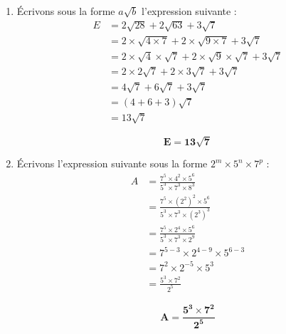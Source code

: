 \documentclass[12pt,a4paper]{article}
\begin{document}
\begin{enumerate}
\item Écrivons sous la forme \( a\sqrt{b} \) l’expression suivante :
\[
\begin{aligned}
    E &= 2\sqrt{28} + 2\sqrt{63} + 3\sqrt{7} \\[6pt]
    &= 2 \times \sqrt{4 \times 7} + 2 \times \sqrt{9 \times 7} + 3\sqrt{7} \\[6pt]
    &= 2 \times \sqrt{4} \times \sqrt{7} + 2 \times \sqrt{9} \times \sqrt{7} + 3\sqrt{7} \\[6pt]
    &= 2 \times 2\sqrt{7} + 2 \times 3\sqrt{7} + 3\sqrt{7} \\[6pt]
    &= 4\sqrt{7} + 6\sqrt{7} + 3\sqrt{7} \\[6pt]
    &= (4 + 6 + 3) \sqrt{7} \\[6pt]
    &= 13\sqrt{7}
\end{aligned}
\]

\begin{tcolorbox}[colback=yellow!20, colframe=black, sharp corners]
    \[
    \mathbf{E = 13\sqrt{7}}
    \]
\end{tcolorbox}
\item Écrivons l’expression suivante sous la forme \( 2^m \times 5^n \times 7^p \) :
\[
\begin{aligned}
    A &= \frac{7^5 \times 4^2 \times 5^6}{5^3 \times 7^3 \times 8^3} \\[6pt]
    &= \frac{7^5 \times (2^2)^2 \times 5^6}{5^3 \times 7^3 \times (2^3)^3} \\[6pt]
    &= \frac{7^5 \times 2^4 \times 5^6}{5^3 \times 7^3 \times 2^9} \\[6pt]
    &= 7^{5-3} \times 2^{4-9} \times 5^{6-3} \\[6pt]
    &= 7^2 \times 2^{-5} \times 5^3 \\[6pt]
    &= \frac{5^3 \times 7^2}{2^5}
\end{aligned}
\]

\begin{tcolorbox}[colback=yellow!20, colframe=black, sharp corners]
    \[
    \mathbf{A = \frac{5^3 \times 7^2}{2^5}}
    \]
\end{tcolorbox}

\end{enumerate}
\end{document}
